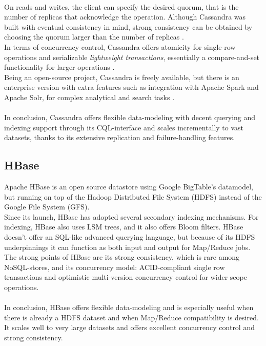 \documentclass{IEEEtran}
\begin{document}
\\On reads and writes, the client can specify the desired quorum, that is the number of replicas that acknowledge the operation. Although Cassandra was built with eventual consistency in mind, strong consistency can be obtained by choosing the quorum larger than the number of replicas \cite{grolinger2013data}.\\
In terms of concurrency control, Cassandra offers atomicity for single-row operations and serializable \textit{lightweight transactions}, essentially a compare-and-set functionality for larger operations \cite{cassandra_lightweight_trans}.\\
Being an open-source project, Cassandra is freely available, but there is an enterprise version with extra features such as integration with Apache Spark and Apache Solr, for complex analytical and search tasks \cite{cassandra_solr} \cite{cassandra_spark}.\\\\
In conclusion, Cassandra offers flexible data-modeling with decent querying and indexing support through its CQL-interface and scales incrementally to vast datasets, thanks to its extensive replication and failure-handling features.

\subsection{HBase}

Apache HBase is an open source datastore using Google BigTable's datamodel, but running on top of the Hadoop Distributed File System (HDFS) instead of the Google File System (GFS).
\\Since its launch, HBase has adopted several secondary indexing mechanisms. For indexing, HBase also uses LSM trees\cite{borthakur2011apache}\cite{sears2012blsm}, and it also offers Bloom filters\cite{hbase_schema}. HBase doesn't offer an SQL-like advanced querying language, but because of its HDFS underpinnings it can function as both input and output for Map/Reduce jobs.
\\The strong points of HBase are its strong consistency, which is rare among NoSQL-stores, and its concurrency model: ACID-compliant single row transactions and optimistic multi-version concurrency control for wider scope operations\cite{hbase_acid}\cite{grolinger2013data}\cite{borthakur2011apache}.\\\\
In conclusion, HBase offers flexible data-modeling and is especially useful when there is already a HDFS dataset and when Map/Reduce compatibility is desired. It scales well to very large datasets and offers excellent concurrency control and strong consistency.
\end{document}
